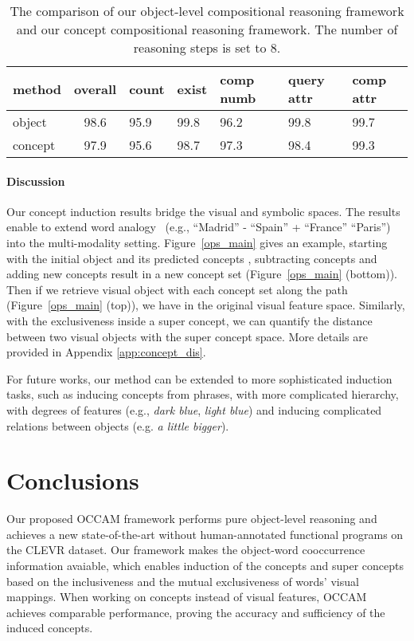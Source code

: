 \documentclass[final]{cvpr}
\begin{document}
\begin{table}[t!]
    \centering
    \caption{\small{The comparison of our object-level compositional reasoning framework and our concept compositional reasoning framework. The number of reasoning steps is set to 8.}}
    \small
    \begin{tabular}{l|c|p{0.45cm}p{0.45cm}p{0.53cm}p{0.53cm}p{0.53cm}}
        \toprule
         method & overall & count & exist & comp numb & query attr & comp attr  \\
         \midrule
         object & 98.6 & 95.9 & 99.8 & 96.2 & 99.8 & 99.7 \\
         
         concept & 97.9&95.6&98.7&97.3&98.4&99.3\\
         \bottomrule
    \end{tabular}
    \label{obj_conc_comp}
    \vspace{-3mm}
\end{table} 





\vspace{-3mm}
\paragraph{Discussion}
Our concept induction results bridge the visual and symbolic spaces. The results enable to extend word analogy~\cite{mikolov2013distributed} (e.g., ``Madrid'' - ``Spain'' + ``France''  ``Paris'') into the multi-modality setting.
Figure~\ref{ops_main} gives an example, starting with the initial object  and its predicted concepts , subtracting concepts  and adding new concepts  result in a new concept set  (Figure~\ref{ops_main} (bottom)). Then if we retrieve visual object  with each concept set  along the path (Figure~\ref{ops_main} (top)), we have  in the original visual feature space.
Similarly, with the exclusiveness inside a super concept, we can quantify the distance between two visual objects with the super concept space.
More details are provided in Appendix \ref{app:concept_dis}.

For future works, our method can be extended to more sophisticated induction tasks, such as inducing concepts from phrases, with more complicated hierarchy, with degrees of features (e.g., \emph{dark blue}, \emph{light blue}) and inducing complicated relations between objects (e.g. \emph{a little bigger}).




\section{Conclusions}
Our proposed OCCAM framework performs pure object-level reasoning and achieves a new state-of-the-art without human-annotated functional programs on the CLEVR dataset.
Our framework makes the object-word cooccurrence information avaiable, which enables induction of the concepts and super concepts based on the inclusiveness and the mutual exclusiveness of words' visual mappings.
When working on concepts instead of visual features, OCCAM achieves comparable performance, proving the accuracy and sufficiency of the induced concepts. 
\end{document}
